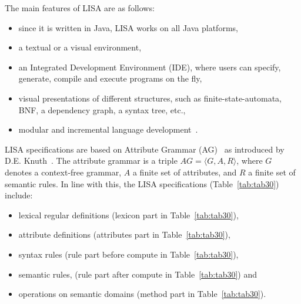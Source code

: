 \documentclass[preprint, prX]{revtex4}
\begin{document}
The main features of LISA are as follows:
\begin{itemize}
 \item since it is written in Java, LISA works on all Java platforms,
 \item a textual or a visual environment,
 \item an Integrated Development Environment (IDE), where users can specify, generate, compile and execute programs on the fly,
 \item visual presentations of different structures, such as finite-state-automata, BNF, a dependency graph, a syntax tree, etc.,
 \item modular and incremental language development~\cite{Mernik:2005a}.
\end{itemize}
LISA specifications are based on Attribute Grammar (AG)~\cite{Paakki:1995} as introduced by D.E. Knuth~\cite{Knuth:1968}.
The attribute grammar is a triple $AG=\langle G,A,R \rangle$, where $G$ denotes a context-free grammar, $A$ a finite set of attributes,
and $R$ a finite set of semantic rules. In line with this, the LISA specifications (Table~\ref{tab:tab30}) include:
\begin{itemize}
  \item lexical regular definitions (lexicon part in Table~\ref{tab:tab30}),
  \item attribute definitions (attributes part in Table~\ref{tab:tab30}),
  \item syntax rules (rule part before compute in Table~\ref{tab:tab30}),
  \item semantic rules, (rule part after compute in Table~\ref{tab:tab30}) and
  \item operations on semantic domains (method part in Table~\ref{tab:tab30}).
\end{itemize}
\end{document}
